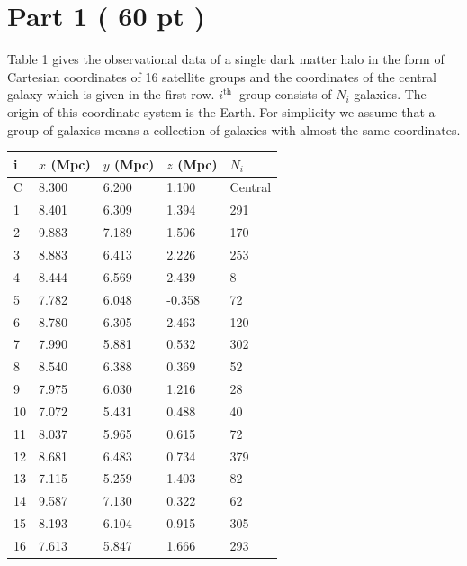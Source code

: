 \documentclass[10pt]{article}
\begin{document}
\section*{Part 1 ( 60 pt )}
Table 1 gives the observational data of a single dark matter halo in the form of Cartesian coordinates of 16 satellite groups and the coordinates of the central galaxy which is given in the first row. $i^{\text {th }}$ group consists of $N_{i}$ galaxies. The origin of this coordinate system is the Earth. For simplicity we assume that a group of galaxies means a collection of galaxies with almost the same coordinates.

\begin{center}
\begin{tabular}{|l|l|l|l|l|}
\hline
i & $x$ (Mpc) & $y$ (Mpc) & $z$ (Mpc) & $N_{i}$ \\
\hline
C & 8.300 & 6.200 & 1.100 & Central \\
\hline
1 & 8.401 & 6.309 & 1.394 & 291 \\
\hline
2 & 9.883 & 7.189 & 1.506 & 170 \\
\hline
3 & 8.883 & 6.413 & 2.226 & 253 \\
\hline
4 & 8.444 & 6.569 & 2.439 & 8 \\
\hline
5 & 7.782 & 6.048 & -0.358 & 72 \\
\hline
6 & 8.780 & 6.305 & 2.463 & 120 \\
\hline
7 & 7.990 & 5.881 & 0.532 & 302 \\
\hline
8 & 8.540 & 6.388 & 0.369 & 52 \\
\hline
9 & 7.975 & 6.030 & 1.216 & 28 \\
\hline
10 & 7.072 & 5.431 & 0.488 & 40 \\
\hline
11 & 8.037 & 5.965 & 0.615 & 72 \\
\hline
12 & 8.681 & 6.483 & 0.734 & 379 \\
\hline
13 & 7.115 & 5.259 & 1.403 & 82 \\
\hline
14 & 9.587 & 7.130 & 0.322 & 62 \\
\hline
15 & 8.193 & 6.104 & 0.915 & 305 \\
\hline
16 & 7.613 & 5.847 & 1.666 & 293 \\
\hline
\end{tabular}
\end{center}
\end{document}
